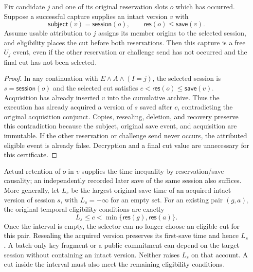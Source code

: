 \begin{lemma}
\label{lem:adaptive-origin-stop}
Fix candidate $j$ and one of its original reservation slots $o$ which has
occurred.  Suppose a successful capture supplies an intact version $v$ with
\[
 \mathsf{subject}(v)=\mathsf{session}(o),\qquad
 \mathsf{res}(o)\le\mathsf{save}(v).
\]
Assume usable attribution to $j$ assigns its member origins to the selected
session, and eligibility places the cut before both reservations.  Then this
capture is a free $U_j$ event, even if the other reservation or challenge send
has not occurred and the final cut has not been selected.
\end{lemma}
\begin{proof}
In any continuation with $E\land A\land(I=j)$, the selected session is
$s=\mathsf{session}(o)$ and the selected cut satisfies
$c<\mathsf{res}(o)\le\mathsf{save}(v)$.  Acquisition has already inserted
$v$ into the cumulative archive. Thus the execution has already acquired a
version of $s$ saved after $c$, contradicting the original acquisition conjunct.
Copies, resealing, deletion, and recovery preserve this contradiction because
the subject, original save event, and acquisition are immutable.  If the other
reservation or challenge send never occurs, the attributed eligible event is
already false.  Decryption and a final cut value are unnecessary for this
certificate.
\end{proof}

Actual retention of $o$ in $v$ supplies the time inequality by reservation/save
causality; an independently recorded later save of the same session also
suffices.  More generally, let $L_s$ be the largest original save time of an
acquired intact version of session $s$, with $L_s=-\infty$ for an empty set.
For an existing pair $(g,a)$, the original temporal eligibility conditions are
exactly
\[
       L_s\le c<\min\{\mathsf{res}(g),\mathsf{res}(a)\}.
\]
Once the interval is empty, the selector can no longer choose an
eligible cut for this pair. Resealing the acquired version preserves
its first-save time and hence $L_s$. A batch-only key fragment or a
public commitment can depend on the target session without containing
an intact version. Neither raises $L_s$ on that account. A cut inside
the interval must also meet the remaining eligibility conditions.

